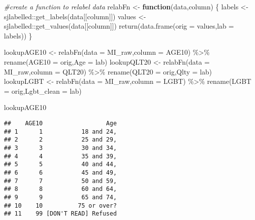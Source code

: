 \documentclass[
]{article}
\newenvironment{Shaded}{\begin{snugshade}}{\end{snugshade}}
\newcommand{\AttributeTok}[1]{\textcolor[rgb]{0.77,0.63,0.00}{#1}}
\newcommand{\CommentTok}[1]{\textcolor[rgb]{0.56,0.35,0.01}{\textit{#1}}}
\newcommand{\ControlFlowTok}[1]{\textcolor[rgb]{0.13,0.29,0.53}{\textbf{#1}}}
\newcommand{\FunctionTok}[1]{\textcolor[rgb]{0.00,0.00,0.00}{#1}}
\newcommand{\NormalTok}[1]{#1}
\newcommand{\OtherTok}[1]{\textcolor[rgb]{0.56,0.35,0.01}{#1}}
\newcommand{\SpecialCharTok}[1]{\textcolor[rgb]{0.00,0.00,0.00}{#1}}
\newcommand{\StringTok}[1]{\textcolor[rgb]{0.31,0.60,0.02}{#1}}
\begin{document}
\begin{Shaded}
\begin{Highlighting}[]
\CommentTok{\#create a function to relabel data}
\NormalTok{relabFn }\OtherTok{\textless{}{-}} \ControlFlowTok{function}\NormalTok{(data,column) \{ }
\NormalTok{  labels }\OtherTok{\textless{}{-}}\NormalTok{ sjlabelled}\SpecialCharTok{::}\FunctionTok{get\_labels}\NormalTok{(data[[column]])}
\NormalTok{  values }\OtherTok{\textless{}{-}}\NormalTok{ sjlabelled}\SpecialCharTok{::}\FunctionTok{get\_values}\NormalTok{(data[[column]])}
  \FunctionTok{return}\NormalTok{(}\FunctionTok{data.frame}\NormalTok{(}\AttributeTok{orig =}\NormalTok{ values,}\AttributeTok{lab =}\NormalTok{ labels))}
\NormalTok{\}}

\NormalTok{lookupAGE10 }\OtherTok{\textless{}{-}} \FunctionTok{relabFn}\NormalTok{(}\AttributeTok{data =}\NormalTok{ MI\_raw,}\AttributeTok{column =} \StringTok{\textquotesingle{}AGE10\textquotesingle{}}\NormalTok{) }\SpecialCharTok{\%\textgreater{}\%}
  \FunctionTok{rename}\NormalTok{(}\AttributeTok{AGE10 =}\NormalTok{ orig,}\AttributeTok{Age =}\NormalTok{ lab)}
\NormalTok{lookupQLT20 }\OtherTok{\textless{}{-}} \FunctionTok{relabFn}\NormalTok{(}\AttributeTok{data =}\NormalTok{ MI\_raw,}\AttributeTok{column =} \StringTok{\textquotesingle{}QLT20\textquotesingle{}}\NormalTok{) }\SpecialCharTok{\%\textgreater{}\%}
  \FunctionTok{rename}\NormalTok{(}\AttributeTok{QLT20 =}\NormalTok{ orig,}\AttributeTok{Qlty =}\NormalTok{ lab)}
\NormalTok{lookupLGBT }\OtherTok{\textless{}{-}} \FunctionTok{relabFn}\NormalTok{(}\AttributeTok{data =}\NormalTok{ MI\_raw,}\AttributeTok{column =} \StringTok{\textquotesingle{}LGBT\textquotesingle{}}\NormalTok{) }\SpecialCharTok{\%\textgreater{}\%}
  \FunctionTok{rename}\NormalTok{(}\AttributeTok{LGBT =}\NormalTok{ orig,}\AttributeTok{Lgbt\_clean =}\NormalTok{ lab)}

\NormalTok{lookupAGE10}
\end{Highlighting}
\end{Shaded}

\begin{verbatim}
##    AGE10                  Age
## 1      1           18 and 24,
## 2      2           25 and 29,
## 3      3           30 and 34,
## 4      4           35 and 39,
## 5      5           40 and 44,
## 6      6           45 and 49,
## 7      7           50 and 59,
## 8      8           60 and 64,
## 9      9           65 and 74,
## 10    10          75 or over?
## 11    99 [DON'T READ] Refused
\end{verbatim}
\end{document}

